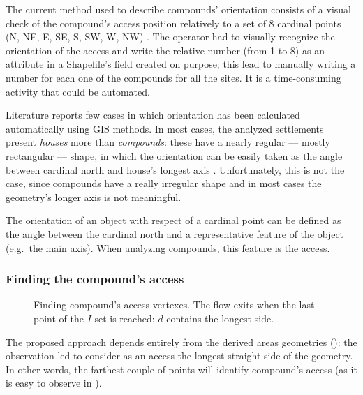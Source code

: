             The current method used to describe compounds' orientation consists of a visual check of the compound's access position relatively to a set of 8 cardinal points (N, NE, E, SE, S, SW, W, NW) %
            . The operator had to visually recognize the orientation of the access and write the relative number (from 1 to 8) as an attribute in a Shapefile's field created on purpose; this lead to manually writing a number for each one of the compounds for all the sites. It is a time-consuming activity that could be automated.

            Literature reports few cases in which orientation has been calculated automatically using GIS methods. In most cases, the analyzed settlements present \emph{houses} more than \emph{compounds}: these have a nearly regular --- mostly rectangular --- shape, in which the orientation can be easily taken as the angle between cardinal north and house's longest axis \cite[p.~53]{spatial-south-europe}. Unfortunately, this is not the case, since compounds have a really irregular shape and in most cases the geometry's longer axis is not meaningful.

            The orientation of an object with respect of a cardinal point can be defined as the angle between the cardinal north and a representative feature of the object (e.g.\ the main axis). When analyzing compounds, this feature is the access.
            \subsubsection{Finding the compound's access}
                \begin{wrapfigure}{r}{0.45\textwidth}
                    \vspace{-0.08\textheight}
                    \centering
                    \begin{tikzpicture}[x=1mm,y=1mm,scale=0.005]
                        
                    \end{tikzpicture}
                    \caption[Logic process to determine the compound's access.]{Finding compound's access vertexes. The flow exits when the last point of the $I$ set is reached: $d$ contains the longest side.}
                    \label{fig:flow-access}
                    \vspace{-0.04\textheight}
                \end{wrapfigure}

                The proposed approach depends entirely from the derived areas geometries (): the observation led to consider as an access the longest straight side of the geometry. In other words, the farthest couple of points will identify compound's access (as it is easy to observe in ).
                
